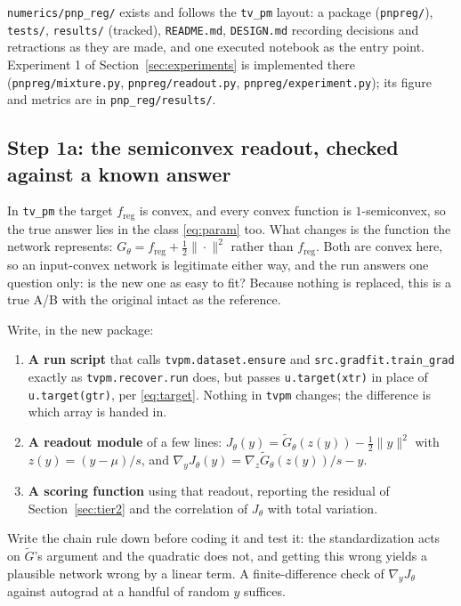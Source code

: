 \documentclass[11pt]{article}
\theoremstyle{definition}
\newcommand{\freg}{f_{\mathrm{reg}}}
\newcommand{\code}[1]{\texttt{#1}}
\begin{document}
\code{numerics/pnp\_reg/} exists and follows the \code{tv\_pm} layout: a package (\code{pnpreg/}), \code{tests/}, \code{results/} (tracked), \code{README.md}, \code{DESIGN.md} recording decisions and retractions as they are made, and one executed notebook as the entry point. Experiment 1 of Section~\ref{sec:experiments} is implemented there (\code{pnpreg/mixture.py}, \code{pnpreg/readout.py}, \code{pnpreg/experiment.py}); its figure and metrics are in \code{pnp\_reg/results/}.

\subsection{Step 1a: the semiconvex readout, checked against a known answer}

In \code{tv\_pm} the target $\freg$ is convex, and every convex function is $1$-semiconvex, so the true answer lies in the class \eqref{eq:param} too. What changes is the function the network represents: $G_\theta = \freg + \tfrac12\|\cdot\|^2$ rather than $\freg$. Both are convex here, so an input-convex network is legitimate either way, and the run answers one question only: is the new one as easy to fit? Because nothing is replaced, this is a true A/B with the original intact as the reference.

Write, in the new package:
\begin{enumerate}[leftmargin=2em]
\item \textbf{A run script} that calls \code{tvpm.dataset.ensure} and \code{src.gradfit.train\_grad} exactly as \code{tvpm.recover.run} does, but passes \code{u.target(xtr)} in place of \code{u.target(gtr)}, per \eqref{eq:target}. Nothing in \code{tvpm} changes; the difference is which array is handed in.
\item \textbf{A readout module} of a few lines: $J_\theta(y) = \widetilde G_\theta(z(y)) - \tfrac12\|y\|^2$ with $z(y) = (y-\mu)/s$, and $\nabla_y J_\theta(y) = \nabla_z\widetilde G_\theta(z(y))/s - y$.
\item \textbf{A scoring function} using that readout, reporting the residual of Section~\ref{sec:tier2} and the correlation of $J_\theta$ with total variation.
\end{enumerate}

Write the chain rule down before coding it and test it: the standardization acts on $\widetilde G$'s argument and the quadratic does not, and getting this wrong yields a plausible network wrong by a linear term. A finite-difference check of $\nabla_y J_\theta$ against autograd at a handful of random $y$ suffices.
\end{document}
